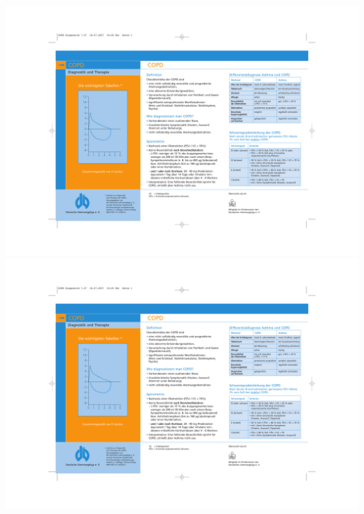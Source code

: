 
{}
\renewcommand{\chaptername}{Anhang} %
\renewcommand\thechapter{\Alph{chapter}}
\setcounter{chapter}{0}
\chapter{} %
\label{chapter:appendix}





\newpage\thispagestyle{empty}
\includegraphics[angle=90,page=1,width=1.1\textwidth]{2_chronisch_obstruktive_lungenerkrankung/figures/copd_tabellen}
\newpage\thispagestyle{empty}
\includegraphics[angle=90,page=2,width=1.1\textwidth]{2_chronisch_obstruktive_lungenerkrankung/figures/copd_tabellen}


